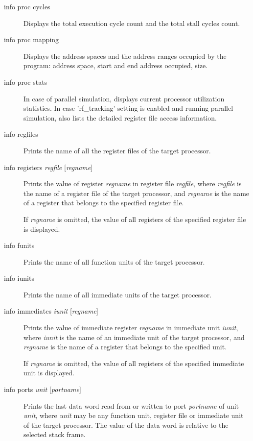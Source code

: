\documentclass[a4paper,twoside]{tceusermanual}
\begin{document}
\begin{description}
\item[info proc cycles] %
  Displays the total execution cycle count and the total stall cycles count.

\item[info proc mapping] %
  Displays the address spaces and the address ranges occupied by the
  program: address space, start and end address occupied, size.

\item[info proc stats] %
  In case of parallel simulation, displays current processor utilization
  statistics. In case 'rf\_tracking' setting is enabled and running parallel
  simulation, also lists the detailed register file access information. 

\item[info regfiles] %
  Prints the name of all the register files of the target processor.

\item[info registers \emph{regfile} {[\emph{regname}]}] %
  Prints the value of register \emph{regname} in register file
  \emph{regfile}, where \emph{regfile}
  is the name of a register file of the target processor, and \emph{regname}
  is the name of a register that belongs to the specified register file.

  If \emph{regname} is omitted, the value of all registers of the specified
  register file is displayed.

\item[info funits] %
  Prints the name of all function units of the target processor.

\item[info iunits] %
  Prints the name of all immediate units of the target processor.

\item[info immediates \emph{iunit} {[\emph{regname}]}] %
  Prints the value of immediate register \emph{regname} in immediate unit
  \emph{iunit}, where \emph{iunit} is the name of an immediate unit of 
  the target processor, and \emph{regname} is the name of a register 
  that belongs to the specified unit.

  If \emph{regname} is omitted, the value of all registers of the specified
  immediate unit is displayed.

\item[info ports \emph{unit} {[\emph{portname}]}] %
  Prints the last data word read from or written to port \emph{portname} of
  unit \emph{unit}, where \emph{unit} may be any function unit, register
  file or immediate unit of the target processor.  The value of the data
  word is relative to the selected stack frame.


\end{description}
\end{document}
